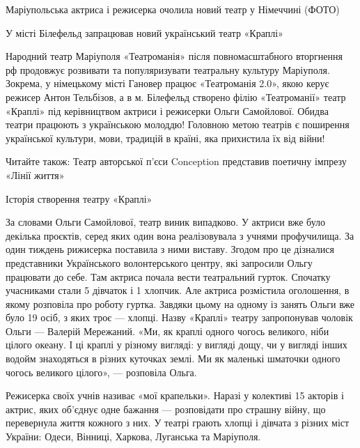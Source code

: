  
 
 
 
 

Маріупольська актриса і режисерка очолила новий театр у Німеччині (ФОТО)

У місті Білефельд запрацював новий український театр «Краплі»

Народний театр Маріуполя «Театроманія» після повномасштабного вторгнення рф
продовжує розвивати та популяризувати театральну культуру Маріуполя. Зокрема, у
німецькому місті Гановер працює «Театроманія 2.0», якою керує режисер Антон
Тельбізов, а в м. Білефельд створено філію «Театроманії» театр «Краплі» під
керівництвом актриси і режисерки Ольги Самойлової. Обидва театри працюють з
українською молоддю! Головною метою театрів є поширення української культури,
мови, традицій в країні, яка прихистила їх від війни!

Читайте також: Театр авторської п'єси Conception представив поетичну імпрезу
«Лінії життя»

Історія створення театру «Краплі»

За словами Ольги Самойлової, театр виник випадково. У актриси вже було декілька
проєктів, серед яких один вона реалізовувала з учнями профучилища. За один
тиждень рижисерка поставила з ними виставу. Згодом про це дізналися
представники Українського волонтерського центру, які запросили Ольгу працювати
до себе. Там актриса почала вести театральний гурток. Спочатку учасниками стали
5 дівчаток і 1 хлопчик. Але актриса розмістила оголошення, в якому розповіла
про роботу гуртка. Завдяки цьому на одному із занять Ольги вже було 19 осіб, з
яких троє — хлопці. Назву «Краплі» театру запропонував чоловік Ольги — Валерій
Мережаний.  «Ми, як краплі одного чогось великого, ніби цілого океану. І ці
краплі у різному вигляді: у вигляді дощу, чи у вигляді інших водойм знаходяться
в різних куточках землі. Ми як маленькі шматочки одного чогось великого
цілого», — розповіла Ольга.

Режисерка своїх учнів називає «мої крапельки». Наразі у колективі 15 акторів і
актрис, яких об'єднує одне бажання — розповідати про страшну війну, що
перевернула життя кожного з них. У театрі грають хлопці і дівчата з різних міст
України: Одеси, Вінниці, Харкова, Луганська та Маріуполя.

